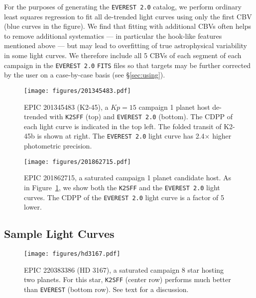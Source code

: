 \documentclass[]{emulateapj}
\newcommand{\Kp}{\ensuremath{Kp}}
\newcommand{\edited}[1]{{\color{red} #1}}
\begin{document}
For the purposes of generating the \texttt{EVEREST 2.0} catalog,
we perform ordinary least squares regression to fit all de-trended light curves
using only the first CBV (blue curves in the figure). We find that fitting with additional CBVs often helps
to remove additional systematics --- in particular the hook-like features mentioned above
--- but may lead to overfitting of true astrophysical variability in some light curves.
We therefore include all 5 CBVs of each segment of each campaign in the \texttt{EVEREST 2.0} \texttt{FITS} files
so that targets may be further corrected by the user on a case-by-case basis (see \S\ref{sec:using}).


\begin{figure}[hbt]
  \begin{center}
      \texttt{[image: figures/201345483.pdf]}
       \caption{EPIC 201345483 (K2-45), a $\Kp = 15$ campaign 1 planet host de-trended
       with \texttt{K2SFF} (top) and \texttt{EVEREST 2.0} (bottom). The CDPP of each light curve
       is indicated in the top left. The folded transit of K2-45b is shown at right. The \texttt{EVEREST 2.0}
       light curve has 2.4$\times$ higher photometric precision.}
     \label{fig:201345483}
  \end{center}
\end{figure}

\begin{figure}[hbt]
  \begin{center}
      \texttt{[image: figures/201862715.pdf]}
       \caption{EPIC 201862715, a saturated campaign 1 planet candidate host. As in
       Figure~\ref{fig:201345483}, we show both the \texttt{K2SFF} and the \texttt{EVEREST 2.0}
       light curves. The CDPP of the \texttt{EVEREST 2.0} light curve is a factor of 5 lower.}
     \label{fig:201862715}
  \end{center}
\end{figure}

\subsection{Sample Light Curves}
\label{sec:sample}

\begin{figure}[hbt]
  \begin{center}
      \texttt{[image: figures/hd3167.pdf]}
       \caption{\edited{EPIC 220383386 (HD 3167), a saturated campaign 8 star hosting two
       planets. For this star,
       \texttt{K2SFF} (center row) performs much better than \texttt{EVEREST} (bottom row).
       See text for a discussion.}}
     \label{fig:hd3167}
  \end{center}
\end{figure}
\end{document}
